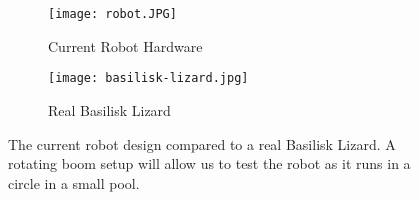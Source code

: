 \vspace{2EX}
\begin{figure}[h]
\centering
\begin{subfigure}[t]{0.47\textwidth}
    \centering
    \texttt{[image: robot.JPG]}
    \caption{Current Robot Hardware}
	\label{fig:robot}
\end{subfigure}
\quad
\begin{subfigure}[t]{0.47\textwidth}
    \centering
    \texttt{[image: basilisk-lizard.jpg]}
    \caption{Real Basilisk Lizard}
	\label{fig:boom}
\end{subfigure}
\vspace{0.5EX}
\caption{The current robot design compared to a real Basilisk Lizard. A rotating boom setup will allow us to test the robot as it runs in a circle in a small pool.} 
\label{fig:test}
\end{figure}
\vspace{-.5in}
